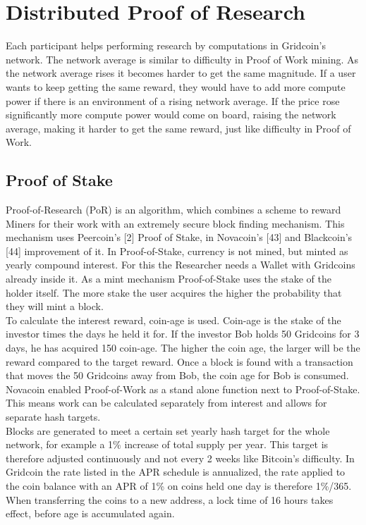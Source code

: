 \section{Distributed Proof of Research}

Each participant helps performing research by computations in Gridcoin's network. The network average is similar to difficulty in Proof of Work mining. As the network average rises it becomes harder to get the same magnitude. If a user wants to keep getting the same reward, they would have to add more compute power if there is an environment of a rising network average. If the price rose significantly more compute power would come on board, raising the network average, making it harder to get the same reward, just like difficulty in Proof of Work.

\subsection{Proof of Stake}

Proof-of-Research (PoR) is an algorithm, which combines a scheme to reward Miners for their work with an extremely secure block finding mechanism. This mechanism uses Peercoin's [2] Proof of Stake, in Novacoin's [43] and Blackcoin's [44] improvement of it. In Proof-of-Stake, currency is not mined, but minted as yearly compound interest. For this the Researcher needs a Wallet with Gridcoins already inside it. As a mint mechanism Proof-of-Stake uses the stake of the holder itself. The more stake the user acquires the higher the probability that they will mint a block.\\

To calculate the interest reward, coin-age is used. Coin-age is the stake of the investor times the days he held it for. If the investor Bob holds 50 Gridcoins for 3 days, he has acquired 150 coin-age. The higher the coin age, the larger will be the reward compared to the target reward. Once a block is found with a transaction that moves the 50 Gridcoins away from Bob, the coin age for Bob is consumed.\\

Novacoin enabled Proof-of-Work as a stand alone function next to Proof-of-Stake. This means work can be calculated separately from interest and allows for separate hash targets.\\

Blocks are generated to meet a certain set yearly hash target for the whole network, for example a 1\% increase of total supply per year. This target is therefore adjusted continuously and not every 2 weeks like Bitcoin's difficulty. In Gridcoin the rate listed in the APR schedule is annualized, the rate applied to the coin balance with an APR of 1\% on coins held one day is therefore 1\%/365. When transferring the coins to a new address, a lock time of 16 hours takes effect, before age is accumulated again.\\

